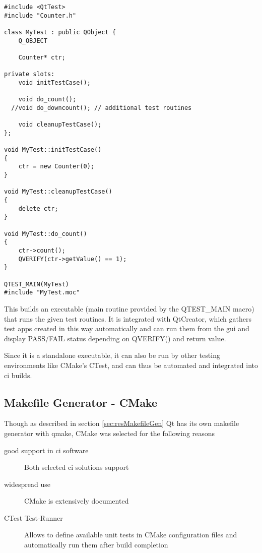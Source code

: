 \begin{lstlisting}
#include <QtTest>
#include "Counter.h"

class MyTest : public QObject {
    Q_OBJECT

    Counter* ctr;

private slots:
    void initTestCase();

    void do_count();
  //void do_downcount(); // additional test routines

    void cleanupTestCase();
};

void MyTest::initTestCase()
{
	ctr = new Counter(0);
}

void MyTest::cleanupTestCase()
{
    delete ctr;
}

void MyTest::do_count()
{
	ctr->count();
	QVERIFY(ctr->getValue() == 1);
}

QTEST_MAIN(MyTest)
#include "MyTest.moc"
\end{lstlisting}

This builds an executable (main routine provided by the QTEST\_MAIN macro) that runs the given test routines.
It is integrated with QtCreator, which gathers test apps created in this way automatically and can run them from the \gls{gui} and display PASS/FAIL status depending on QVERIFY() and return value.
\begin{figure}[h]
\end{figure}

Since it is a standalone executable, it can also be run by other testing environments like CMake's CTest, and can thus be automated and integrated into \gls{ci} builds.

\begin{figure}[h]
\end{figure}

\subsection{Makefile Generator - CMake}
Though as described in section \ref{sec:resMakefileGen} Qt has its own makefile generator with qmake, CMake was selected for the following reasons
\begin{description}
	\item[good support in \gls{ci} software] Both selected \gls{ci} solutions support 
	\item[widespread use] CMake is extensively documented 
	\item[CTest Test-Runner] Allows to define available unit tests in CMake configuration files and automatically run them after build completion 
\end{description}

